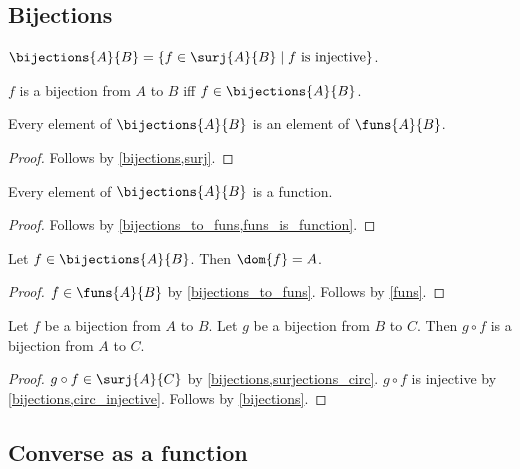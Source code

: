 \subsection{Bijections}

\begin{definition}\label{bijections}
    $\bijections{A}{B} = \{ f\in\surj{A}{B} \mid \text{$f$ is injective}\}$.
\end{definition}

\begin{abbreviation}\label{bijection}
    $f$ is a bijection from $A$ to $B$ iff $f\in\bijections{A}{B}$.
\end{abbreviation}

\begin{proposition}\label{bijections_to_funs}
    Every element of $\bijections{A}{B}$ is an element of $\funs{A}{B}$.
\end{proposition}
\begin{proof}
    Follows by \cref{bijections,surj}.
\end{proof}

\begin{proposition}\label{bijection_is_function}
    Every element of $\bijections{A}{B}$ is a function.
\end{proposition}
\begin{proof}
    Follows by \cref{bijections_to_funs,funs_is_function}.
\end{proof}

\begin{proposition}\label{bijections_dom}
    Let $f\in\bijections{A}{B}$.
    Then $\dom{f} = A$.
\end{proposition}
\begin{proof}
    $f\in\funs{A}{B}$ by \cref{bijections_to_funs}.
    Follows by \cref{funs}.
\end{proof}

\begin{proposition}\label{bijection_circ}
    Let $f$ be a bijection from $A$ to $B$.
    Let $g$ be a bijection from $B$ to $C$.
    Then $g\circ f$ is a bijection from $A$ to $C$.
\end{proposition}
\begin{proof}
    $g\circ f\in\surj{A}{C}$ by \cref{bijections,surjections_circ}.
    $g\circ f$ is injective by \cref{bijections,circ_injective}.
    Follows by \cref{bijections}.
\end{proof}

\subsection{Converse as a function}

